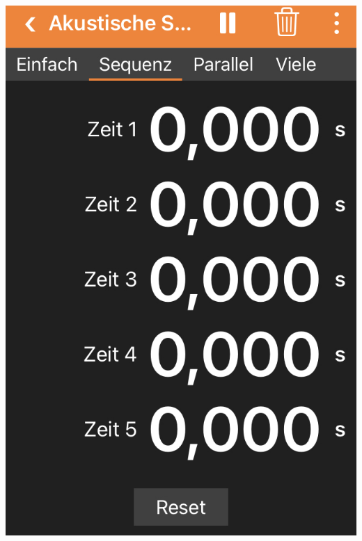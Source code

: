\documentclass[../main.tex]{subfiles}
\begin{document}
\begin{tcolorbox}
\begin{minipage}[]{0.2\textwidth}
        \includegraphics[width=1.2\textwidth]{img/app2}
        

\end{minipage}
\end{tcolorbox}
\end{document}
